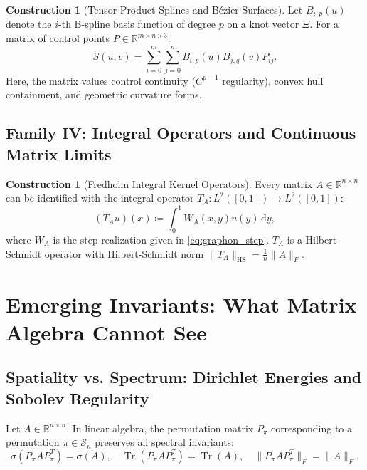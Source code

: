 \documentclass[11pt,a4paper,reqno]{amsart}
\theoremstyle{definition}
\newtheorem{construction}[theorem]{Construction}
\numberwithin{equation}{section}
\newcommand{\R}{\mathbb{R}}
\newcommand{\Tr}{\operatorname{Tr}}
\newcommand{\dif}{\,\mathrm{d}}
\begin{document}
\begin{construction}[Tensor Product Splines and B\'ezier Surfaces]
Let $B_{i, p}(u)$ denote the $i$-th B-spline basis function of degree $p$ on a knot vector $\Xi$. For a matrix of control points $P \in \R^{m \times n \times 3}$:
\begin{equation}
    S(u, v) = \sum_{i=0}^m \sum_{j=0}^n B_{i, p}(u) B_{j, q}(v) P_{ij}.
\end{equation}
Here, the matrix values control continuity ($C^{p-1}$ regularity), convex hull containment, and geometric curvature forms.
\end{construction}

\subsection{Family IV: Integral Operators and Continuous Matrix Limits}
\label{subsec:fam4}

\begin{construction}[Fredholm Integral Kernel Operators]
Every matrix $A \in \R^{n \times n}$ can be identified with the integral operator $T_A \colon L^2([0, 1]) \to L^2([0, 1])$:
\begin{equation}
    (T_A u)(x) \coloneqq \int_0^1 W_A(x, y) u(y) \dif y,
\end{equation}
where $W_A$ is the step realization given in \eqref{eq:graphon_step}. $T_A$ is a Hilbert-Schmidt operator with Hilbert-Schmidt norm $\|T_A\|_{\mathrm{HS}} = \frac{1}{n} \|A\|_F$.
\end{construction}

\section{Emerging Invariants: What Matrix Algebra Cannot See}
\label{sec:emerging_invariants}

\subsection{Spatiality vs. Spectrum: Dirichlet Energies and Sobolev Regularity}
\label{subsec:sobolev}

Let $A \in \R^{n \times n}$. In linear algebra, the permutation matrix $P_\pi$ corresponding to a permutation $\pi \in \mathcal{S}_n$ preserves all spectral invariants:
\begin{equation}
    \sigma(P_\pi A P_\pi^T) = \sigma(A), \quad \Tr(P_\pi A P_\pi^T) = \Tr(A), \quad \|P_\pi A P_\pi^T\|_F = \|A\|_F.
\end{equation}
\end{document}
